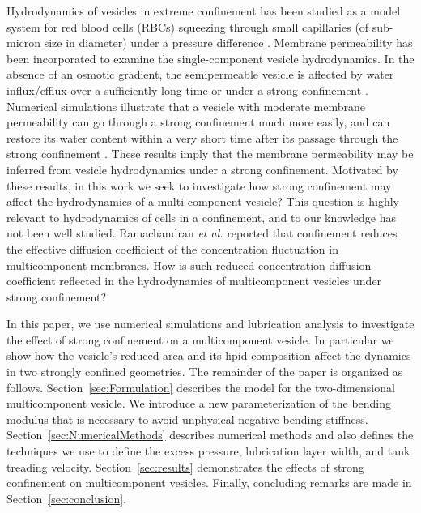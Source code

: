 \documentclass[twoside,twocolumn,9pt]{article}
\begin{document}
Hydrodynamics of vesicles in extreme confinement has been studied as a model system for red blood cells (RBCs) squeezing through small
capillaries (of sub-micron size in diameter) under a pressure difference \cite{LuPeng2019_PoF,che-lyu-jae-leo2020,gur-pak-tay-siv-sac2023}. Membrane permeability has been incorporated to examine the single-component vesicle hydrodynamics. In the absence of an osmotic gradient, the semipermeable vesicle is affected by water influx/efflux over a sufficiently long time or under a strong confinement \cite{qua-gan-you2021}. Numerical simulations illustrate that a vesicle with moderate membrane permeability can go through a strong confinement much more easily, and can restore its water content within a very short time after its passage through the strong confinement \cite{qua-gan-you2021}.  These results imply that the membrane permeability may be inferred from vesicle hydrodynamics under a strong confinement.  Motivated by these results, in this work we seek to investigate how strong confinement may affect the hydrodynamics of a multi-component vesicle? This question is highly relevant to hydrodynamics of cells in a confinement, and to our knowledge has not been well studied. 
Ramachandran {\it et al.} \cite{ram-kom-sek-ima2010} reported that confinement reduces the effective diffusion coefficient of the concentration fluctuation in multicomponent membranes. How is such reduced concentration diffusion coefficient reflected in the hydrodynamics of multicomponent vesicles under strong confinement?


In this paper, we use numerical simulations and lubrication analysis \cite{mis-wis-ber-key-li-tun-law-per-erd-zha-zha-sun-kal-lam-kon2019} 
to investigate the effect of strong confinement on a multicomponent vesicle.
In particular we show how the vesicle's reduced
area and its lipid composition affect the dynamics in two strongly
confined geometries.
%
The remainder of the paper is organized as follows.
Section~\ref{sec:Formulation} describes the model for the
two-dimensional multicomponent vesicle. We introduce a new
parameterization of the bending modulus that is necessary to avoid
unphysical negative bending stiffness.
Section~\ref{sec:NumericalMethods} describes numerical methods and also
defines the techniques we use to define the excess pressure, lubrication
layer width, and tank treading velocity. Section~\ref{sec:results}
demonstrates the effects of strong confinement on multicomponent
vesicles. Finally, concluding remarks are made in
Section~\ref{sec:conclusion}.
\end{document}
